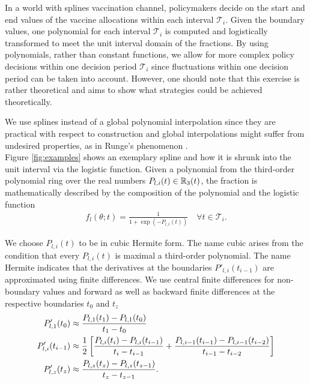 In a world with splines vaccination channel, policymakers decide on the start and end values of the vaccine allocations within each interval $\mathcal{T}_i$. Given the boundary values, one polynomial for each interval $\mathcal{T}_i$ is computed and logistically transformed to meet the unit interval domain of the fractions. By using polynomials, rather than constant functions, we allow for more complex policy decisions within one decision period $\mathcal{T}_i$ since fluctuations within one decision period can be taken into account. However, one should note that this exercise is rather theoretical and aims to show what strategies could be achieved theoretically.

We use splines instead of a global polynomial interpolation since they are practical with respect to construction and global interpolations might suffer from undesired properties, as in Runge's phenomenon \citep{Runge.1901}.\\
 
%
Figure \ref{fig:examples} shows an exemplary spline and how it is shrunk into the unit interval via the logistic function. %
Given a polynomial from the third-order polynomial ring over the real numbers $P_{l,i}(t) \in \mathbb{R}_3(t)$, the fraction is mathematically described by the composition of the polynomial and the logistic function
\begin{align}
f_{l}(\theta; t) =  \frac{1}{1 + \exp{(-P_{l,i}(t))}} \quad \forall t \in \mathcal{T}_i. 
\end{align}

We choose $P_{l,i}(t)$ to be in cubic Hermite form. The name cubic arises from the condition that every $P_{l,i}(t)$ is maximal a third-order polynomial. The name Hermite indicates that the derivatives at the boundaries $P'_{l,i}(t_{i-1})$ are approximated using finite differences. We use central finite differences for non-boundary values and forward as well as backward finite differences at the respective boundaries $t_0$ and $t_{z}$
\begin{align}
\label{eq:finite_differences}
P'_{l,1}(t_0) &\approx \frac{P_{l,1}(t_1) - P_{l,1}(t_0)}{t_1 - t_0} \\
P'_{l,i}(t_{i-1}) &\approx \frac{1}{2}\left[\frac{P_{l,i}(t_{i}) - P_{l,i}(t_{i-1})}{t_{i} - t_{i-1}} + \frac{P_{l,i-1}(t_{i-1}) - P_{l,i-1}( t_{i-2})}{t_{i-1} - t_{i-2}} \right] \notag \\
P'_{l,z}(t_{z}) &\approx \frac{P_{l,z}(t_{z}) - P_{l,z}(t_{z-1})}{t_{z} - t_{z-1}} \notag .
\end{align}

